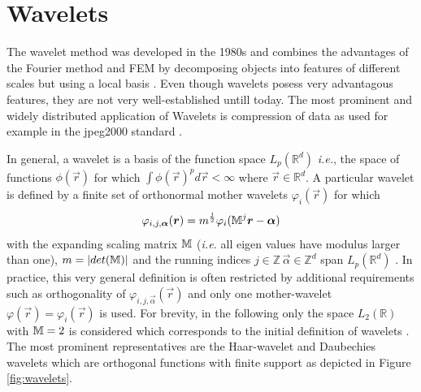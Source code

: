 {\section{Wavelets}
\label{ch:wavelet}
The wavelet method was developed in the 1980s \cite{waveletLA} and combines the advantages of the Fourier method and FEM by decomposing objects into features of different scales but using a local basis \cite{waveletLA, dahlke, FdFeWavelet}.
Even though wavelets posess very advantagous features, they are not very well-established untill today.
The most prominent and widely distributed application of Wavelets is compression of data as used for example in the jpeg2000 standard \cite{iso15444}.

In general, a wavelet is a basis of the function space $L_p(\mathbb{R}^d)$ \textit{i.e.}, the space of functions $\phi(\vec{r})$ for which $\int \phi(\vec{r})^p d\vec{r}<\infty$ where $\vec{r}\in\mathbb{R}^d$.
A particular wavelet is defined by a finite set of orthonormal mother wavelets $\varphi_i(\vec{r})$ for which
\begin{equation} \label{eq:waveBasis}
\varphi_{i,j,\bm{\alpha}}(\bm{r})=m^{\frac{j}{2}} \varphi_i(\mathbb{M}^j\bm{r}-\bm{\alpha})
\end{equation}
with the expanding scaling matrix $\mathbb{M}$ (\textit{i.e.} all eigen values have modulus larger than one), $m=|det(\mathbb{M})|$ and the running indices $j\in \mathbb{Z}\, \vec{\alpha}\in \mathbb{Z}^d$ span $L_p(\mathbb{R}^d)$ \cite{dahlke}.
In practice, this very general definition is often restricted by additional requirements such as orthogonality of $\varphi_{i,j,\vec{\alpha}}(\vec{r})$ and only one mother-wavelet $\varphi(\vec{r})=\varphi_i(\vec{r})$ is used.
For brevity, in the following only the space $L_2(\mathbb{R})$ with $\mathbb{M}=2$ is considered which corresponds to the initial definition of wavelets \cite{Tasche}.
The most prominent representatives are the Haar-wavelet and Daubechies wavelets which are orthogonal functions with finite support as depicted in Figure \ref{fig:wavelets}.

}
